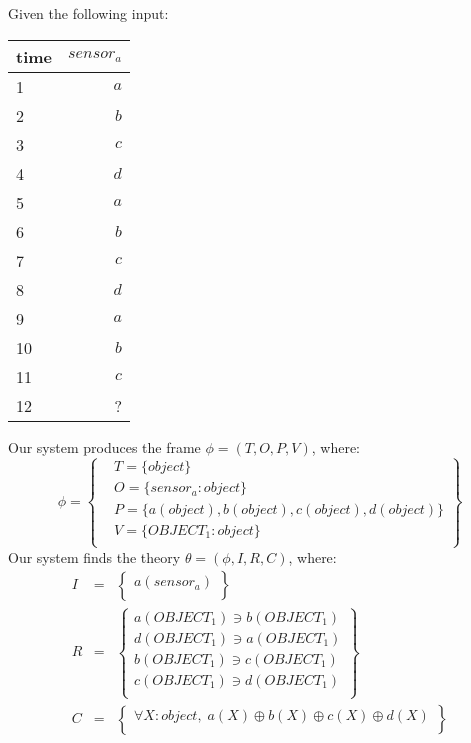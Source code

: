 
Given the following input:
\begin{table}[ht!]
\begin{center}
\begin{tabular}{|l|r|}
\hline
time & $\mathit{sensor}_a$\\
\hline
1 & $\mathit{a}$ \\
2 & $\mathit{b}$ \\
3 & $\mathit{c}$ \\
4 & $\mathit{d}$ \\
5 & $\mathit{a}$ \\
6 & $\mathit{b}$ \\
7 & $\mathit{c}$ \\
8 & $\mathit{d}$ \\
9 & $\mathit{a}$ \\
10 & $\mathit{b}$ \\
11 & $\mathit{c}$ \\
12 & ? \\
\hline
\end{tabular}
\end{center}
\end{table}

Our system produces the frame $\phi = (T, O, P, V)$, where:
\begin{equation*}
\phi = \left \{
\begin{aligned}
& T = \{ 
object
\}\\
& O = \{
\mathit{sensor}_a: object
\}\\
& P = \{
\mathit{a}(object),\mathit{b}(object),\mathit{c}(object),\mathit{d}(object)
\}\\
& V = \{
OBJECT_1: object
\}\\
\end{aligned}\right\}
\end{equation*}
Our system finds the theory $\theta = (\phi, I, R, C)$, where:
\begin{eqnarray*}
I & = & \left\{ \begin{array}{l}
\mathit{a}(\mathit{sensor}_a)\\
\end{array}\right\}\\
R & = &  \left\{ \begin{array}{l}
\mathit{a}(\mathit{OBJECT}_1) \ni \mathit{b}(\mathit{OBJECT}_1)\\
\mathit{d}(\mathit{OBJECT}_1) \ni \mathit{a}(\mathit{OBJECT}_1)\\
\mathit{b}(\mathit{OBJECT}_1) \ni \mathit{c}(\mathit{OBJECT}_1)\\
\mathit{c}(\mathit{OBJECT}_1) \ni \mathit{d}(\mathit{OBJECT}_1)\\
\end{array}\right\}\\
C & = & \left\{ \begin{array}{l}
\forall X : object,\;\mathit{a}(X) \oplus \mathit{b}(X) \oplus \mathit{c}(X) \oplus \mathit{d}(X)\\
\end{array}\right\}\\
\end{eqnarray*}

